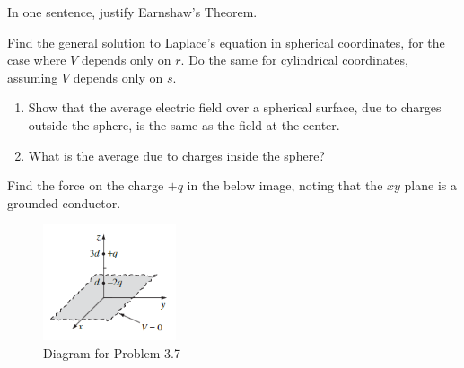 \begin{hwkProblem}{3.2}{}

	In one sentence, justify Earnshaw's Theorem.

	\hwkSol{}

\end{hwkProblem}
\begin{hwkProblem}{3.3}{}

	Find the general solution to Laplace's equation in spherical coordinates, for the case where \( V \) depends only on \( r \). Do the same for cylindrical coordinates, assuming \( V \) depends only on \( s \).

	\hwkSol{}

\end{hwkProblem}
\begin{hwkProblem}{3.4}{}

	\begin{enumerate}
		\item Show that the average electric field over a spherical surface, due to charges outside the sphere, is the same as the field at the center.
		\item What is the average due to charges inside the sphere?
	\end{enumerate}

	\hwkSol{}

\end{hwkProblem}
\begin{hwkProblem}{3.7}{}

	Find the force on the charge \( +q \) in the below image, noting that the \( xy \) plane is a grounded conductor.
	\begin{figure}[H]
		\begin{center}
			\includegraphics[width=0.35\textwidth]{./images/p3_7.png}
		\end{center}
		\caption{Diagram for Problem 3.7}\label{fig:p3_7}
	\end{figure}

	\hwkSol{}

\end{hwkProblem}
